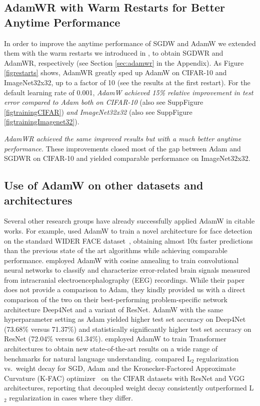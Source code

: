 \documentclass[usenames,dvipsnames]{article}
\begin{document}
\subsection{AdamWR with Warm Restarts for Better Anytime Performance}
 
In order to improve the anytime performance of SGDW and AdamW we extended them with the warm restarts we introduced in \citet{loshchilov2016sgdr}, to obtain SGDWR and AdamWR, respectively (see Section \ref{sec:adamwr} in the Appendix). 
As Figure \ref{figrestarts} shows, AdamWR greatly sped up AdamW on CIFAR-10 and ImageNet32x32, up to a factor of 10 (see the results at the first restart).
For the default learning rate of 0.001, \emph{AdamW achieved 15\% relative improvement in test error compared to Adam both on CIFAR-10} (also see SuppFigure  \ref{figtrainingCIFAR}) \emph{and ImageNet32x32} 
(also see SuppFigure \ref{figtrainingImagenet32}). 

\emph{AdamWR achieved the same improved results but with a much better anytime performance.} 
These improvements closed most of the gap between Adam and SGDWR on CIFAR-10 
and yielded comparable performance on ImageNet32x32. 

\subsection{Use of AdamW on other datasets and architectures}

Several other research groups have already successfully applied AdamW in citable works.
For example, \citet{2018arXiv180406559W} used AdamW to train a novel architecture for face detection on the standard WIDER FACE dataset~\citep{yang2016wider}, obtaining almost 10x faster predictions than the previous state of the art algorithms while achieving comparable performance. 
\citet{volker2018intracranial} employed AdamW with cosine annealing to train convolutional neural networks to classify and characterize error-related brain signals measured from intracranial electroencephalography (EEG) recordings.
While their paper does not provide a comparison to Adam, they kindly provided us with a direct comparison of the two on their best-performing problem-specific network architecture Deep4Net and a variant of ResNet. AdamW  with the same hyperparameter setting as Adam yielded higher test set accuracy on Deep4Net (73.68\% versus 71.37\%) and statistically significantly higher test set accuracy on ResNet (72.04\% versus 61.34\%). 
\citet{radford2018improving} employed AdamW 
to train Transformer~\citep{vaswani2017attention} architectures to obtain new state-of-the-art results on a wide range of benchmarks for natural language understanding. \citet{zhang2018three} compared L$_2$ regularization vs.\ weight decay for SGD, Adam and the Kronecker-Factored Approximate Curvature (K-FAC) optimizer~\citep{martens2015optimizing} on the CIFAR datasets with ResNet and VGG architectures, reporting that decoupled weight decay consistently outperformed L$_2$ regularization in cases where they differ. 
\end{document}

